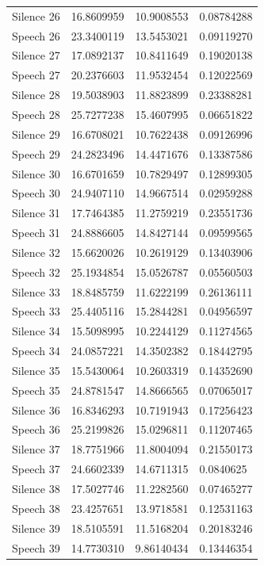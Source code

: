\documentclass[12pt]{article} %
\begin{document}
\begin{center}
\begin{longtable}{llll}
 Silence 26  &  16.8609959&  10.9008553&  0.08784288\\ 
 Speech 26  &  23.3400119&  13.5453021&  0.09119270\\ 
 Silence 27  &  17.0892137&  10.8411649&  0.19020138\\ 
 Speech 27  &  20.2376603&  11.9532454&  0.12022569\\ 
 Silence 28  &  19.5038903&  11.8823899&  0.23388281\\ 
 Speech 28  &  25.7277238&  15.4607995&  0.06651822\\ 
 Silence 29  &  16.6708021&  10.7622438&  0.09126996\\ 
 Speech 29  &  24.2823496&  14.4471676&  0.13387586\\ 
 Silence 30  &  16.6701659&  10.7829497&  0.12899305\\ 
 Speech 30  &  24.9407110&  14.9667514&  0.02959288\\ 
 Silence 31  &  17.7464385&  11.2759219&  0.23551736\\ 
 Speech 31  &  24.8886605&  14.8427144&  0.09599565\\ 
 Silence 32  &  15.6620026&  10.2619129&  0.13403906\\ 
 Speech 32  &  25.1934854&  15.0526787&  0.05560503\\ 
 Silence 33  &  18.8485759&  11.6222199&  0.26136111\\ 
 Speech 33  &  25.4405116&  15.2844281&  0.04956597\\ 
 Silence 34  &  15.5098995&  10.2244129&  0.11274565\\ 
 Speech 34  &  24.0857221&  14.3502382&  0.18442795\\ 
 Silence 35  &  15.5430064&  10.2603319&  0.14352690\\ 
 Speech 35  &  24.8781547&  14.8666565&  0.07065017\\ 
 Silence 36  &  16.8346293&  10.7191943&  0.17256423\\ 
 Speech 36  &  25.2199826&  15.0296811&  0.11207465\\ 
 Silence 37  &  18.7751966&  11.8004094&  0.21550173\\ 
 Speech 37  &  24.6602339&  14.6711315&  0.0840625\\ 
 Silence 38  &  17.5027746&  11.2282560&  0.07465277\\ 
 Speech 38  &  23.4257651&  13.9718581&  0.12531163\\ 
 Silence 39  &  18.5105591&  11.5168204&  0.20183246\\ 
 Speech 39  &  14.7730310&  9.86140434&  0.13446354\\ 

\end{longtable}
\end{center}
\end{document}
